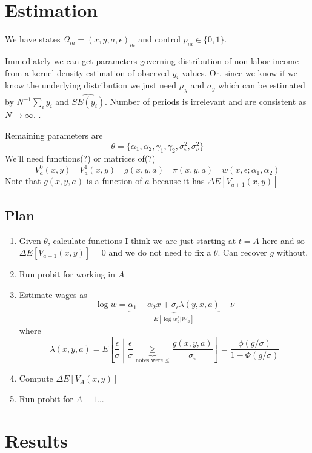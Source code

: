 \documentclass[11pt,letterpaper]{article}
\begin{document}
\section{Estimation}

We have states $\Omega_{ia} = (x,y,a,\epsilon)_{ia}$ and control $p_{ia} \in \{0,1\}$. 

Immediately we can get parameters governing distribution of non-labor income from a kernel density estimation of observed $y_i$ values. Or, since we know if we know the underlying distribution we just need $\mu_y$ and $\sigma_y$ which can be estimated by $N^{-1}\sum\nolimits_i y_i$ and $\widehat{SE(y_i)}$. Number of periods is irrelevant and are consistent as $N\rightarrow \infty$. .

Remaining parameters are
\[
\theta = \{ \alpha_1, \alpha_2, \gamma_1, \gamma_2, \sigma_\epsilon^2, \sigma^2_\nu \}
\]
We'll need functions(?) or matrices of(?)
\[
V_a^0(x,y) \quad V_a^1(x,y) \quad g(x,y,a) \quad \pi(x,y,a) \quad w(x,\epsilon; \alpha_1, \alpha_2)
\]
Note that $g(x,y,a)$ is a function of $a$ because it has $\Delta E[V_{a+1}(x,y)]$

\subsection{Plan}
\begin{enumerate}
    \item Given $\theta$, calculate functions {\color{cyan} I think we are just starting at $t=A$ here and so $\Delta E[V_{a+1}(x,y)] = 0$ and we do not need to fix a $\theta$. Can recover $g$ without.}
    \item Run probit for working in $A$
    \item Estimate wages as 
    \[
        \log w = \underbrace{\alpha_1 + \alpha_2 x + \sigma_\epsilon \lambda(y,x,a)}_{E[\log w_a^* | \mathcal W_a]} + \nu
    \] 
    where
    \[
        \lambda(x,y,a) = E\left[\frac{\epsilon}{\sigma} \middle | \frac{\epsilon}{\sigma} \underbrace{\geq}_{\text{notes were } \leq} \frac{g(x,y,a)}{\sigma_\epsilon}\right]
        = \frac{\phi(g/\sigma)}{1- \Phi(g/\sigma)}
    \]
    \item Compute $\Delta E[V_A(x,y)]$
    \item Run probit for $A-1$...
\end{enumerate}

\section{Results}
\end{document}
